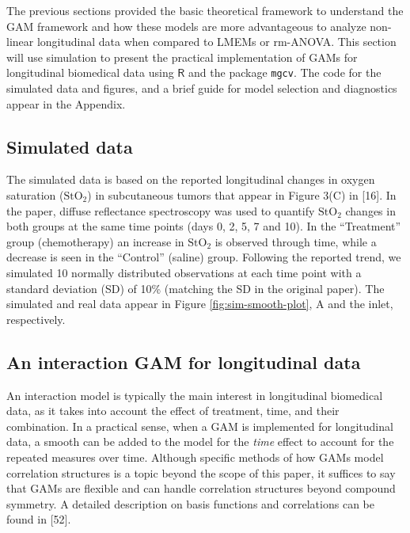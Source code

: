 \documentclass[
]{article}
\begin{document}
The previous sections provided the basic theoretical framework to understand the GAM framework and how these models are more advantageous to analyze non-linear longitudinal data when compared to LMEMs or rm-ANOVA. This section will use simulation to present the practical implementation of GAMs for longitudinal biomedical data using \(\textsf{R}\) and the package \texttt{mgcv}. The code for the simulated data and figures, and a brief guide for model selection and diagnostics appear in the Appendix.

\hypertarget{simulated-data}{%
\subsection{Simulated data}\label{simulated-data}}

The simulated data is based on the reported longitudinal changes in oxygen saturation (\(\mbox{StO}_2\)) in subcutaneous tumors that appear in Figure 3(C) in {[}16{]}. In the paper, diffuse reflectance spectroscopy was used to quantify \(\mbox{StO}_2\) changes in both groups at the same time points (days 0, 2, 5, 7 and 10). In the ``Treatment'' group (chemotherapy) an increase in \(\mbox{StO}_2\) is observed through time, while a decrease is seen in the ``Control'' (saline) group. Following the reported trend, we simulated 10 normally distributed observations at each time point with a standard deviation (SD) of 10\% (matching the SD in the original paper).
The simulated and real data appear in Figure \ref{fig:sim-smooth-plot}, A and the inlet, respectively.

\hypertarget{an-interaction-gam-for-longitudinal-data}{%
\subsection{An interaction GAM for longitudinal data}\label{an-interaction-gam-for-longitudinal-data}}

An interaction model is typically the main interest in longitudinal biomedical data, as it takes into account the effect of treatment, time, and their combination. In a practical sense, when a GAM is implemented for longitudinal data, a smooth can be added to the model for the \emph{time} effect to account for the repeated measures over time. Although specific methods of how GAMs model correlation structures is a topic beyond the scope of this paper, it suffices to say that GAMs are flexible and can handle correlation structures beyond compound symmetry. A detailed description on basis functions and correlations can be found in {[}52{]}.
\end{document}
